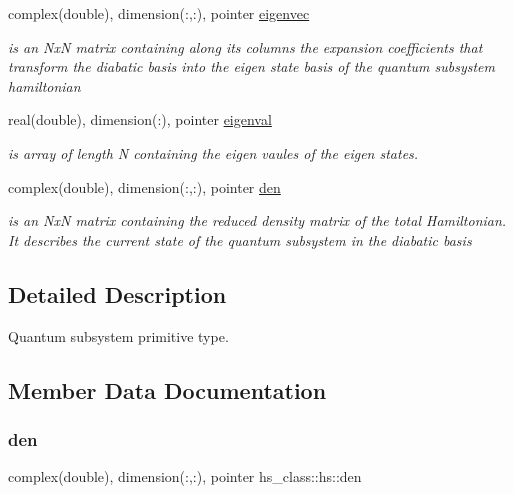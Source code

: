 \begin{DoxyCompactItemize}
complex(double), dimension(\+:,\+:), pointer \hyperlink{strucths__class_1_1hs_aac60f7bc14df6c4a5a1363c70b69b2db}{eigenvec}
\begin{DoxyCompactList}\small\item\em is an NxN matrix containing along its columns the expansion coefficients that transform the diabatic basis into the eigen state basis of the quantum subsystem hamiltonian \end{DoxyCompactList}\item 
real(double), dimension(\+:), pointer \hyperlink{strucths__class_1_1hs_ae978013c998c123a7430209fa2797511}{eigenval}
\begin{DoxyCompactList}\small\item\em is array of length N containing the eigen vaules of the eigen states. \end{DoxyCompactList}\item 
complex(double), dimension(\+:,\+:), pointer \hyperlink{strucths__class_1_1hs_ad8d40ef9d0cb7af5e9d889f2ec05225d}{den}
\begin{DoxyCompactList}\small\item\em is an NxN matrix containing the reduced density matrix of the total Hamiltonian. It describes the current state of the quantum subsystem in the diabatic basis \end{DoxyCompactList}\end{DoxyCompactItemize}


\subsection{Detailed Description}
Quantum subsystem primitive type. 

\subsection{Member Data Documentation}
\mbox{\label{strucths__class_1_1hs_ad8d40ef9d0cb7af5e9d889f2ec05225d}} 
\subsubsection{\texorpdfstring{den}{den}}
{\footnotesize\ttfamily complex(double), dimension(\+:,\+:), pointer hs\+\_\+class\+::hs\+::den\hspace{0.3cm}{\ttfamily [private]}}




